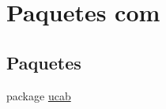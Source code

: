 \hypertarget{namespacecom}{\section{Paquetes com}
\label{namespacecom}
}
\subsection*{Paquetes}
\begin{DoxyCompactItemize}
\item 
package \hyperlink{namespacecom_1_1ucab}{ucab}
\end{DoxyCompactItemize}
